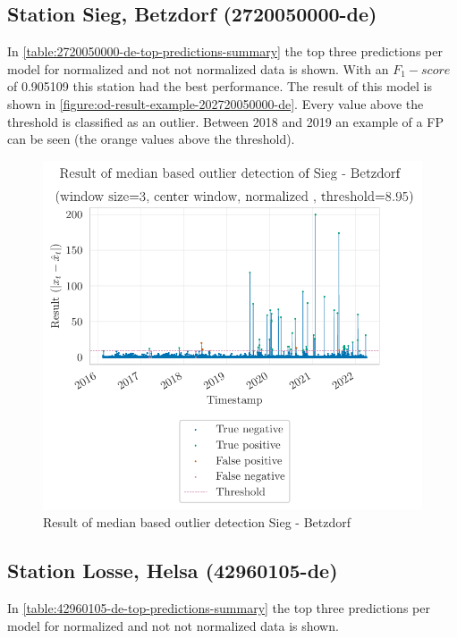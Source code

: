 

\subsection{Station Sieg, Betzdorf (2720050000-de)}
In \autoref{table:2720050000-de-top-predictions-summary} the top three predictions per model for normalized and not not normalized data is shown. With an $F_1-score$ of 0.905109 this station had the best performance. The result of this model is shown in \autoref{figure:od-result-example-202720050000-de}. Every value above the threshold is classified as an outlier. Between 2018 and 2019 an example of a \ac{FP} can be seen (the orange values above the threshold).

\begin{figure}[htp]
    \centering 
    \includegraphics{plots/pdfs/2720050000-de/od_result_median_2720050000-de_all.pdf}
    \caption{Result of median based outlier detection Sieg - Betzdorf}
    \label{figure:od-result-example-202720050000-de}
\end{figure}



\subsection{Station Losse, Helsa (42960105-de)}
In \autoref{table:42960105-de-top-predictions-summary} the top three predictions per model for normalized and not not normalized data is shown.


